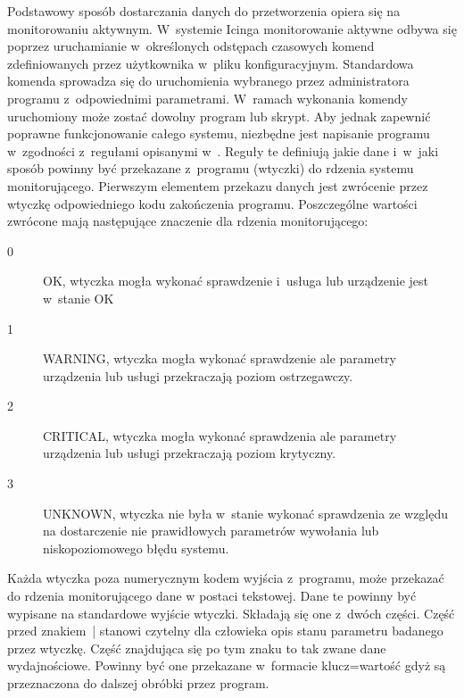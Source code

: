 Podstawowy sposób dostarczania danych do przetworzenia opiera się na
monitorowaniu aktywnym. W~systemie Icinga monitorowanie aktywne odbywa
się poprzez uruchamianie w~określonych odstępach czasowych komend
zdefiniowanych przez użytkownika w~pliku konfiguracyjnym. Standardowa
komenda sprowadza się do uruchomienia wybranego przez administratora
programu z~odpowiednimi parametrami. W~ramach wykonania komendy
uruchomiony może zostać dowolny program lub skrypt. Aby jednak
zapewnić poprawne funkcjonowanie całego systemu, niezbędne jest
napisanie programu w~zgodności z~regułami opisanymi
w~\cite{www:NagiosPluginsTutorial}. Reguły te definiują jakie dane
i~w~jaki sposób powinny być przekazane z~programu (wtyczki) do rdzenia
systemu monitorującego. Pierwszym elementem przekazu danych jest
zwrócenie przez wtyczkę odpowiedniego kodu zakończenia
programu. Poszczególne wartości zwrócone mają następujące znaczenie
dla rdzenia monitorującego:

\begin{description}
\item[0] OK, wtyczka mogła wykonać sprawdzenie i~usługa lub urządzenie
  jest w~stanie OK
\item[1] WARNING, wtyczka mogła wykonać sprawdzenie ale parametry
  urządzenia lub usługi przekraczają poziom ostrzegawczy.
\item[2] CRITICAL, wtyczka mogła wykonać sprawdzenia ale parametry
  urządzenia lub usługi przekraczają poziom krytyczny.
\item[3] UNKNOWN, wtyczka nie była w~stanie wykonać sprawdzenia ze
  względu na dostarczenie nie prawidłowych parametrów wywołania lub
  niskopoziomowego błędu systemu.
\end{description}

Każda wtyczka poza numerycznym kodem wyjścia z~programu, może
przekazać do rdzenia monitorującego dane w postaci tekstowej. Dane te
powinny być wypisane na standardowe wyjście wtyczki. Składają się one
z~dwóch części. Część przed znakiem~| stanowi czytelny dla człowieka
opis stanu parametru badanego przez wtyczkę. Część znajdująca się po
tym znaku to tak zwane dane wydajnościowe. Powinny być one przekazane
w~formacie klucz=wartość gdyż są przeznaczona do dalszej obróbki przez
program.

